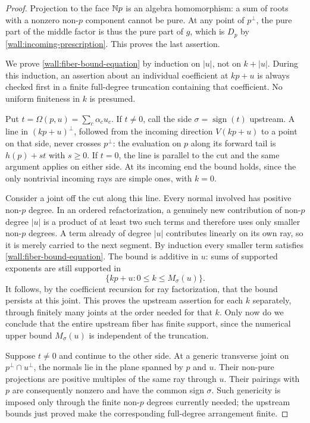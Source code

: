 \begin{proof}
Projection to the face $\mathbb N p$ is an algebra homomorphism: a sum
of roots with a nonzero non-$p$ component cannot be pure.  At any
point of $p^\perp$, the pure part of the middle factor is thus
the pure part of $g$, which is $D_p$ by
\eqref{wall:incoming-prescription}.  This proves the last
assertion.

We prove \eqref{wall:fiber-bound-equation} by induction on
$|u|$, not on $k+|u|$.  During this induction, an assertion about
an individual coefficient at $kp+u$ is always checked first in a
finite full-degree truncation containing that coefficient.  No
uniform finiteness in $k$ is presumed.

Put $t=\Omega(p,u)=\sum_c\alpha_cu_c$.  If $t\ne0$, call the
side $\sigma=\operatorname{sign}(t)$ upstream.  A line in
$(kp+u)^\perp$, followed from the incoming direction
$V(kp+u)$ to a point on that side, never crosses $p^\perp$:
the evaluation on $p$ along its forward tail is $h(p)+st$ with
$s\ge0$.  If $t=0$, the line is parallel to the cut and the
same argument applies on either side.  At its incoming end the
bound holds, since the only nontrivial incoming rays are simple
ones, with $k=0$.

Consider a joint off the cut along this line.  Every normal
involved has positive non-$p$ degree.  In an ordered
refactorization, a genuinely new contribution of non-$p$ degree
$|u|$ is a product of at least two such terms and therefore
uses only smaller non-$p$ degrees.  A term already of degree
$|u|$ contributes linearly on its own ray, so it is merely
carried to the next segment.  By induction every smaller term
satisfies \eqref{wall:fiber-bound-equation}.  The bound is
additive in $u$: sums of supported exponents are still
supported in
\[
 \{kp+u:0\le k\le M_\sigma(u)\}.
\]
It follows, by the coefficient recursion for ray
factorization, that the bound persists at this joint.  This
proves the upstream assertion for each $k$ separately, through
finitely many joints at the order needed for that $k$.
Only now do we conclude that the entire upstream fiber has
finite support, since the numerical upper bound
$M_\sigma(u)$ is independent of the truncation.

Suppose $t\ne0$ and continue to the other side.  At a generic
transverse joint on $p^\perp\cap u^\perp$, the normals lie
in the plane spanned by $p$ and $u$.  Their non-pure
projections are positive multiples of the same ray through
$u$.  Their pairings with $p$ are consequently nonzero and
have the common sign $\sigma$.  Such genericity is imposed
only through the finite non-$p$ degrees currently needed;
the upstream bounds just proved make the corresponding
full-degree arrangement finite.


\end{proof}
